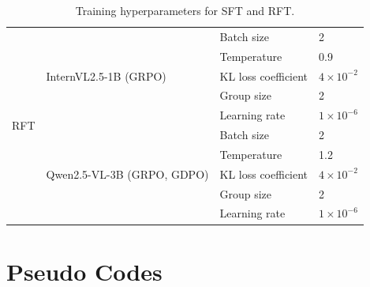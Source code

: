 \documentclass{article}
\begin{document}
\begin{table}[h]
\begin{tabular}{llll}
\midrule

\multirow{10}{*}{RFT}
& \multirow{5}{*}{InternVL2.5-1B (GRPO)}
& Batch size & 2 \\
& & Temperature & 0.9 \\ 
& & KL loss coefficient & $4\times10^{-2}$ \\
& & Group size & 2 \\
& & Learning rate & $1\times10^{-6}$ \\
\cmidrule(lr){2-4}

& \multirow{5}{*}{Qwen2.5-VL-3B (GRPO, GDPO)}
& Batch size & 2 \\
& & Temperature & 1.2 \\
& & KL loss coefficient & $4\times10^{-2}$ \\
& & Group size & 2 \\
& & Learning rate & $1\times10^{-6}$ \\

\bottomrule
\end{tabular}
\caption{Training hyperparameters for SFT and RFT.}
\label{tab:hyperparams_all}
\end{table}



\clearpage
\section{Pseudo Codes}
\label{appendix:pseudo_codes}
\end{document}
